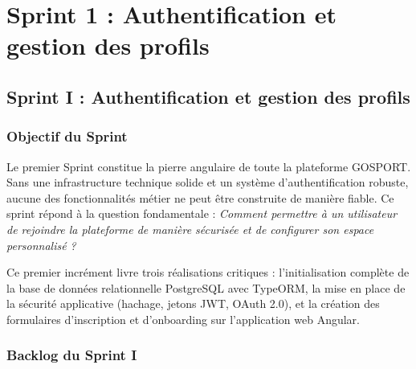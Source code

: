 \chapter{Sprint 1 : Authentification et gestion des profils}
\minitoc
\newpage

\section{Sprint I : Authentification et gestion des profils}

\subsection{Objectif du Sprint}
Le premier Sprint constitue la pierre angulaire de toute la plateforme GOSPORT. Sans une infrastructure technique solide et un système d'authentification robuste, aucune des fonctionnalités métier ne peut être construite de manière fiable. Ce sprint répond à la question fondamentale : \textit{Comment permettre à un utilisateur de rejoindre la plateforme de manière sécurisée et de configurer son espace personnalisé ?}

Ce premier incrément livre trois réalisations critiques : l'initialisation complète de la base de données relationnelle PostgreSQL avec TypeORM, la mise en place de la sécurité applicative (hachage, jetons JWT, OAuth 2.0), et la création des formulaires d'inscription et d'onboarding sur l'application web Angular.

\subsection{Backlog du Sprint I}

\begin{table}[H]
\centering
\renewcommand{\arraystretch}{1.4}
\caption{Backlog du Sprint 1 -- Authentification et Onboarding}
\end{table}

